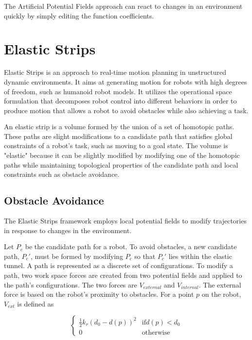 \documentclass[10pt,conference]{ieeeconf}
\begin{document}
The Artificial Potential Fields approach can react to changes in an environment quickly by simply editing the function coefficients.

\section{Elastic Strips}

Elastic Strips \cite{brock2002elastic} is an approach to real-time motion planning in unstructured dynamic environments. It aims at generating motion for robots with high degrees of freedom, such as humanoid robot models. It utilizes the operational space formulation \cite{khatib1987unified} that decomposes robot control into different behaviors in order to produce motion that allows a robot to avoid obstacles while also achieving a task. 

An elastic strip is a volume formed by the union of a set of homotopic paths. These paths are slight modifications to a candidate path that satisfies global constraints of a robot's task, such as moving to a goal state. The volume is "elastic" because it can be slightly modified by modifying one of the homotopic paths while maintaining topological properties of the candidate path and local constraints such as obstacle avoidance. 

\subsection{Obstacle Avoidance}

The Elastic Strips framework employs local potential fields to modify trajectories in response to changes in the environment. 

Let $P_c$ be the candidate path for a robot. To avoid obstacles, a new candidate path, $P_c'$, must be formed by modifying $P_c$ so that $P_c'$ lies within the elastic tunnel. A path is represented as a discrete set of configurations. To modify a path, two work space forces are created from two potential fields and applied to the path's configurations. The two forces are $V_{external}$ and $V_{internal}$. The external force is based on the robot's proximity to obstacles. For a point $p$ on the robot, $V_{ext}$ is defined as

\[ \begin{cases} 
      \frac{1}{2}k_r(d_0 - d(p))^2 & \text{if}  d(p) < d_0 \\
      0 & \text{otherwise}
   \end{cases}
\]
\end{document}
